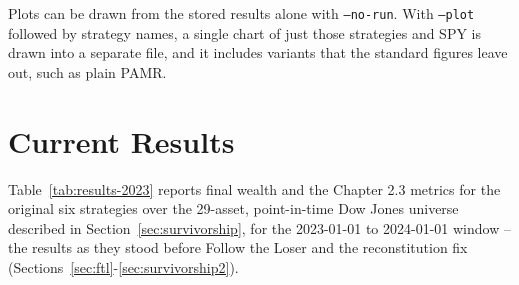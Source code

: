 \documentclass[11pt]{article}
\begin{document}
Plots can be drawn from the stored results alone with \texttt{--no-run}.
With \texttt{--plot} followed by strategy names, a single chart of just
those strategies and SPY is drawn into a separate file, and it includes
variants that the standard figures leave out, such as plain PAMR.

\section{Current Results}
\label{sec:results}

Table~\ref{tab:results-2023} reports final wealth and the Chapter 2.3
metrics for the original six strategies over the 29-asset, point-in-time
Dow Jones universe described in Section~\ref{sec:survivorship}, for the
2023-01-01 to 2024-01-01 window -- the results as they stood before
Follow the Loser and the reconstitution fix (Sections~\ref{sec:ftl}-\ref{sec:survivorship2}).

\begin{table}[h]
\centering
{}
\caption{Final wealth and Chapter 2.3 evaluation metrics, 2023-01-01 to
2024-01-01, 29 Dow Jones constituents as of the start date.
$^*$Best Stock is reported separately since it is a hindsight benchmark,
not a causal strategy (Section~\ref{sec:beststock}).}
\label{tab:results-2023}
\end{table}
\end{document}
